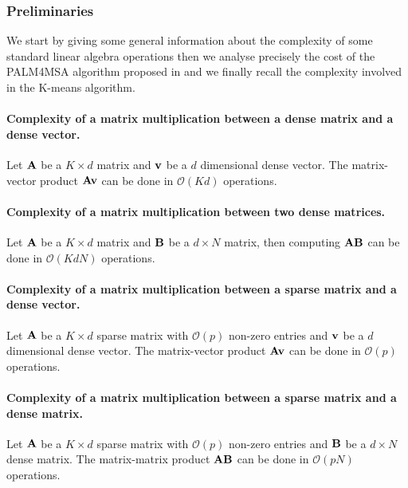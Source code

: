 
\subsubsection{Preliminaries}

We start by giving some general information about the complexity of some standard linear algebra operations then we analyse precisely the cost of the PALM4MSA algorithm proposed in 
\cite{magoarou2014learning}  and we finally recall the complexity involved in the K-means algorithm.

\paragraph{Complexity of a matrix multiplication between a dense matrix and a dense vector.}
Let ${\mathbf{A}}$ be a $K \times d $ matrix and ${\mathbf{v}}$ be a $d$ dimensional dense vector. The matrix-vector product ${\mathbf{A}}{\mathbf{v}}$ can be done in $\mathcal{O}\left(Kd \right)$ operations.

\paragraph{Complexity of a matrix multiplication between two dense matrices.}
Let ${\mathbf{A}}$ be a $K \times d $ matrix and ${\mathbf{B}}$ be a $d \times N$ matrix, then computing ${\mathbf{A}} {\mathbf{B}}$ can be done in $\mathcal{O}\left (KdN \right )$ operations.

\paragraph{Complexity of a matrix multiplication between a sparse matrix and a dense vector.}
Let ${\mathbf{A}}$ be a $K \times d$ sparse matrix with $\mathcal{O}(p)$ non-zero entries and ${\mathbf{v}}$ be a $d$ dimensional dense vector. The matrix-vector product ${\mathbf{A}}{\mathbf{v}}$ can be done in $\mathcal{O}\left(p \right)$ operations.

\paragraph{Complexity of a matrix multiplication between a sparse matrix and a dense matrix.}
Let ${\mathbf{A}}$ be a $K \times d$ sparse matrix with $\mathcal{O}(p)$ non-zero entries and ${\mathbf{B}}$ be a $d \times N$ dense matrix. The matrix-matrix product ${\mathbf{A}}{\mathbf{B}}$ can be done in $\mathcal{O}\left(p N\right)$ operations.

